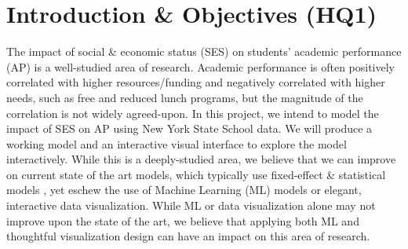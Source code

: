 \documentclass[sigconf,nonacm,11pt]{acmart}
\begin{document}



\maketitle



\section{Introduction \& Objectives (HQ1)}

The impact of  social \& economic status (SES) on students' academic performance (AP) is a well-studied area of research.  Academic performance is often positively correlated with higher resources/funding \cite{jinnai}and negatively correlated with higher needs, such as free and reduced lunch programs\cite{sirin}, but the magnitude of the correlation is not widely agreed-upon. In this project, we intend to model the impact of SES on AP using New York State School data. We will produce a working model and an interactive visual interface to explore the model interactively. While this is a deeply-studied area, we believe that we can improve on current state of the art models, which typically use fixed-effect \& statistical models \cite{hearn, farooq}, yet eschew the use of Machine Learning (ML) models or elegant, interactive data visualization. While ML or data visualization alone may not improve upon the state of the art, we believe that applying both ML and thoughtful visualization design can have an impact on this area of research.
\end{document}
